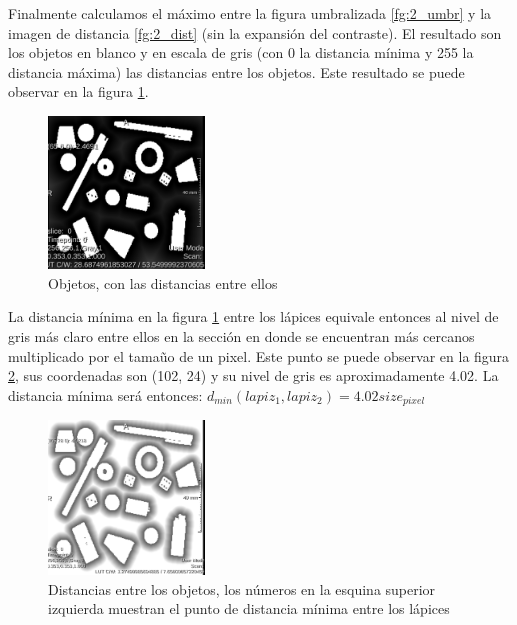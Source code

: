 \documentclass{article}
\begin{document}
\begin{par}
Finalmente calculamos el m\'{a}ximo entre la figura umbralizada \ref{fg:2_umbr} y la imagen de distancia \ref{fg:2_dist} (sin la expansi\'{o}n del contraste). El resultado son los objetos en blanco y en escala de gris (con 0 la distancia m\'{i}nima y 255 la distancia m\'{a}xima) las distancias entre los objetos. Este resultado se puede observar en la figura \ref{fg:2_final}.  
\end{par}

\begin{figure}[ht]
\begin{center}
\includegraphics[width=0.37\textwidth]{2Distancia/2_final} %
\caption{Objetos, con las distancias entre ellos}
\label{fg:2_final}
\end{center}
\end{figure}
\FloatBarrier

\begin{par}
La distancia m\'{i}nima en la figura \ref{fg:2_final} entre los l\'{a}pices equivale entonces al nivel de gris m\'{a}s claro entre ellos en la secci\'{o}n en donde se encuentran m\'{a}s cercanos multiplicado por el tama\~{u}o de un pixel. Este punto se puede observar en la figura \ref{fg:2_min}, sus coordenadas son (102, 24) y su nivel de gris es aproximadamente 4.02. La distancia m\'{i}nima ser\'{a} entonces: $d_{min} (lapiz_1, lapiz_2) = 4.02 size_{pixel} $
\end{par}

\begin{figure}[ht]
\begin{center}
\includegraphics[width=0.37\textwidth]{2Distancia/2_min} %
\caption{Distancias entre los objetos, los n\'{u}meros en la esquina superior izquierda muestran el punto de distancia m\'{i}nima entre los l\'{a}pices}
\label{fg:2_min}
\end{center}
\end{figure}
\FloatBarrier
\end{document}
